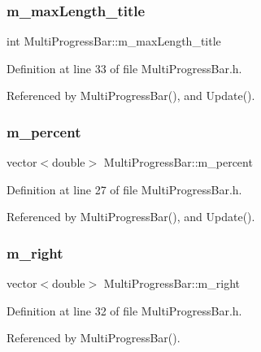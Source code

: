 \subsubsection{m\+\_\+max\+Length\+\_\+title}
{\footnotesize\ttfamily int Multi\+Progress\+Bar\+::m\+\_\+max\+Length\+\_\+title\hspace{0.3cm}{\ttfamily [protected]}}



Definition at line 33 of file Multi\+Progress\+Bar.\+h.



Referenced by Multi\+Progress\+Bar(), and Update().

\mbox{\label{classMultiProgressBar_a4776b46fbbea37fb83caedbe8e45a5e1_a4776b46fbbea37fb83caedbe8e45a5e1}} 
\subsubsection{m\+\_\+percent}
{\footnotesize\ttfamily vector$<$double$>$ Multi\+Progress\+Bar\+::m\+\_\+percent\hspace{0.3cm}{\ttfamily [protected]}}



Definition at line 27 of file Multi\+Progress\+Bar.\+h.



Referenced by Multi\+Progress\+Bar(), and Update().

\mbox{\label{classMultiProgressBar_a5cf91e4bca7a5959e9abd67a398389dc_a5cf91e4bca7a5959e9abd67a398389dc}} 
\subsubsection{m\+\_\+right}
{\footnotesize\ttfamily vector$<$double$>$ Multi\+Progress\+Bar\+::m\+\_\+right\hspace{0.3cm}{\ttfamily [protected]}}



Definition at line 32 of file Multi\+Progress\+Bar.\+h.



Referenced by Multi\+Progress\+Bar().

\mbox{\label{classMultiProgressBar_a1e81427871e1604a72672eed3cc1a476_a1e81427871e1604a72672eed3cc1a476}} 
